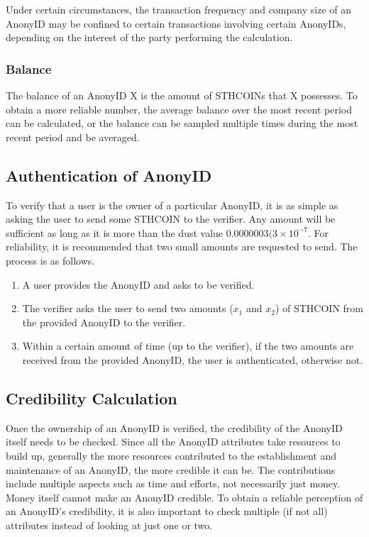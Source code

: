 \documentclass[12pt, a4paper]{article}
\begin{document}
Under certain circumstances, the transaction frequency and company size of an AnonyID may be confined to certain transactions involving certain AnonyIDs, depending on the interest of the party performing the calculation.

\subsubsection{Balance}

The balance of an AnonyID X is the amount of STHCOINs that X possesses. To obtain a more reliable number, the average balance over the most recent period can be calculated, or the balance can be sampled multiple times during the most recent period and be averaged.


\subsection{Authentication of AnonyID}
\label{authentication}

To verify that a user is the owner of a particular AnonyID, it is as simple as asking the user to send some STHCOIN to the verifier. Any amount will be sufficient as long as it is more than the dust value $0.0000003 (3 \times 10^{-7}$. For reliability, it is recommended that two small amounts are requested to send. The process is as follows.

\begin{enumerate}
\item A user provides the AnonyID and asks to be verified.
\item The verifier asks the user to send two amounts ($x_1$ and $x_2$) of STHCOIN from the provided AnonyID to the verifier. 
\item Within a certain amount of time (up to the verifier), if the two amounts are received from the provided AnonyID, the user is authenticated, otherwise not.
\end{enumerate}

\subsection{Credibility Calculation}

Once the ownership of an AnonyID is verified, the credibility of the AnonyID itself needs to be checked. Since all the AnonyID attributes take resources to build up, generally the more resources contributed to the establishment and maintenance of an AnonyID, the more credible it can be. The contributions include multiple aspects such as time and efforts, not necessarily just money. Money itself cannot make an AnonyID credible. To obtain a reliable perception of an AnonyID's credibility, it is also important to check multiple (if not all) attributes instead of looking at just one or two.
\end{document}
